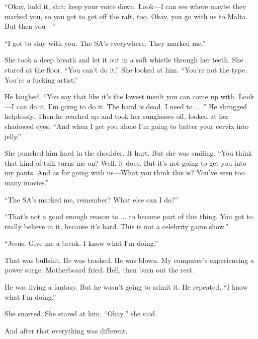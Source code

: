 ``Okay, hold it, shit; keep your voice down. Look—I can see where maybe they marked you, so you got to get off the raft, too. Okay, you go with us to Malta. But then you—''

``I got to stay with you. The SA's everywhere. They marked me.''

She took a deep breath and let it out in a soft whistle through her teeth. She stared at the floor. ``You can't do it.'' She looked at him. ``You're not the type. You're a fucking artist.''

He laughed. ``You say that like it's the lowest insult you can come up with. Look—I can do it. I'm going to do it. The band is dead. I need to ... '' He shrugged helplessly. Then he reached up and took her sunglasses off, looked at her shadowed eyes. ``And when I get you alone I'm going to batter your cervix into jelly.''

She punched him hard in the shoulder. It hurt. But she was smiling. ``You think that kind of talk turns me on? Well, it does. But it's not going to get you into my pants. And as for going with us—What you think this is? You've seen too many movies.''

``The SA's marked me, remember? What else can I do?''

``That's not a good enough reason to ... to become part of this thing. You got to really believe in it, because it's hard. This is not a celebrity game show.''

``Jesus. Give me a break. I know what I'm doing.''

That was bullshit. He was trashed. He was blown. My computer's experiencing a power surge. Motherboard fried. Hell, then burn out the rest.

He was living a fantasy. But he wasn't going to admit it. He repeated, ``I know what I'm doing.''

She snorted. She stared at him. ``Okay,'' she said.

And after that everything was different.

